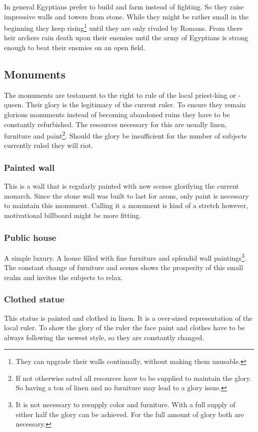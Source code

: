 \documentclass[a4paper]{article}
\begin{document}
	In general \gls{Egyptians} prefer to build and farm instead of fighting.
	So they raise impressive walls and towers from stone.
	While they might be rather small in the beginning they keep rising\footnote{
		They can upgrade their walls continually, without making them unusable.
	}
	until they are only rivaled by \gls{Romans}.
	From there heir archers rain death upon their enemies
	until the army of \gls{Egyptians} is strong enough to beat their enemies on 
	an open field.

	\subsection{Monuments}
		The monuments are testament to the right to rule of the local priest-king or -queen.
		Their glory is the legitimacy of the current ruler.
		To ensure they remain glorious monuments instead of becoming abandoned ruins
		they have to be constantly refurbished.
		The resources necessary for this are usually linen, furniture and paint\footnote{
			If not otherwise sated all resources have to be supplied to maintain the glory.
			So having a ton of linen and no furniture may lead to a glory issue.
		}.
		Should the glory be insufficient for the number of subjects currently ruled
		they will riot.

		\subsubsection{Painted wall}
			This is a wall that is regularly painted with new scenes glorifying the current monarch.
			Since the stone wall was built to last for aeons,
			only paint is necessary to maintain this monument.
			Calling it a monument is kind of a stretch however,
			motivational billboard might be more fitting.

		\subsubsection{Public house}
			A simple luxury. A house filled with fine furniture and splendid wall paintings\footnote{
				It is not necessary to resupply color and furniture.
				With a full supply of either half the glory can be achieved.
				For the full amount of glory both are necessary.
			}.
			The constant change of furniture and scenes shows the prosperity of this small realm
			and invites the subjects to relax.

		\subsubsection{Clothed statue}
			This statue is painted and clothed in linen.
			It is a over-sized representation of the local ruler.
			To show the glory of the ruler the face paint and clothes
			have to be always following the newest style,
			so they are constantly changed.
\end{document}

